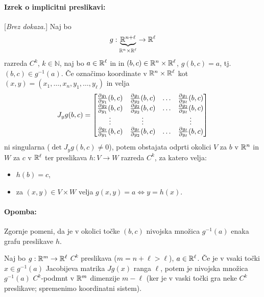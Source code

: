 \begin{trditev}
	\paragraph{Izrek o implicitni preslikavi:} [\emph{Brez dokaza.}] Naj bo
	\[
		g : \underbrace{\mathbb{R}^{n + \ell}}_{\mathbb{R}^n \times \mathbb{R}^\ell} \to \mathbb{R}^\ell
	\]
	razreda $C^k$, $k \in \mathbb{N}$, naj bo $a \in \mathbb{R}^\ell$ in in $(b, c) \in \mathbb{R}^n \times \mathbb{R}^\ell$, $g (b, c) = a$, tj. $(b, c) \in g^{-1} (a)$.
	\v Ce ozna\v cimo koordinate v $\mathbb{R}^n \times \mathbb{R}^\ell$ kot $(x,y) = (x_1, \ldots, x_n, y_1, \ldots, y_\ell)$ in velja
	\[
		J_y g(b ,c) = \begin{bmatrix}
			\frac{\partial g_1}{\partial y_1}(b,c)    & \frac{\partial g_1}{\partial y_2}(b,c)    & \ldots & \frac{\partial g_1}{\partial y_\ell}(b,c)    \\
			\frac{\partial g_2}{\partial y_1}(b,c)    & \frac{\partial g_2}{\partial y_2}(b,c)    & \ldots & \frac{\partial g_2}{\partial y_\ell}(b,c)    \\
			\vdots                   & \vdots                   &        & \vdots                      \\
			\frac{\partial g_\ell}{\partial y_1}(b,c) & \frac{\partial g_\ell}{\partial y_2}(b,c) & \ldots & \frac{\partial g_\ell}{\partial y_\ell}(b,c)
		\end{bmatrix}
	\]
	ni singularna ($\det J_y g(b,c) \neq 0$), potem obstajata odprti okolici $V$ za $b$ v $\mathbb{R}^n$ in $W$ za $c$ v $\mathbb{R}^\ell$ ter
	preslikava $h : V \to W$ razreda $C^k$, za katero velja:
	\begin{itemize}
		\item{$h(b) = c$,}
		\item{za $(x,y) \in V \times W$ velja $g(x,y) = a \iff y = h(x)$.}
	\end{itemize}
\end{trditev}

\paragraph{Opomba:} Zgornje pomeni, da je v okolici to\v cke $(b,c)$ nivojska mno\v zica $g^{-1}(a)$ enaka grafu preslikave $h$.

\begin{posledica}
	Naj bo $g : \mathbb{R}^m \to \mathbb{R}^\ell$ $C^k$ preslikava ($m = n + \ell > \ell$), $a \in \mathbb{R}^\ell$. \v Ce je v vsaki to\v cki $x \in g^{-1}(a)$ Jacobijeva
	matrika $Jg(x)$ ranga $\ell$, potem je nivojska mno\v zica $g^{-1}(a)$ $C^k$-podmnt v $\mathbb{R}^m$ dimenzije $m - \ell$ (ker je v vaski to\v cki gra
	neke $C^k$ preslikave; spremenimo koordinatni sistem).
\end{posledica}

